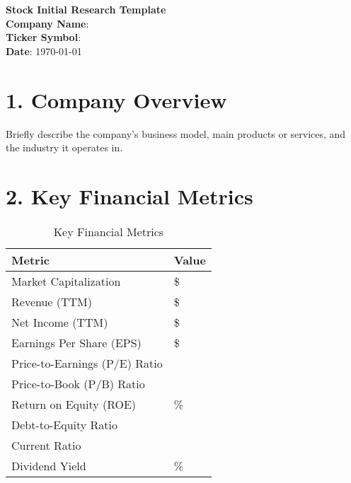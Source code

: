 \documentclass[12pt]{article}
\begin{document}
\begin{center}
    {\Large \textbf{Stock Initial Research Template}}\\[1.5em]
    \textbf{Company Name}: \underline{\hspace{8cm}}\\[0.5em]
    \textbf{Ticker Symbol}: \underline{\hspace{7cm}}\\[0.5em]
    \textbf{Date}: \today
\end{center}

\vspace{1em}

\section*{1. Company Overview}
Briefly describe the company's business model, main products or services, and the industry it operates in.

\section*{2. Key Financial Metrics}
\begin{table}[H]
    \centering
    \begin{tabular}{@{}ll@{}}
        \toprule
        \textbf{Metric}                 & \textbf{Value}                    \\
        \midrule
        Market Capitalization           & \$\underline{\hspace{5cm}}        \\
        Revenue (TTM)                   & \$\underline{\hspace{5cm}}        \\
        Net Income (TTM)                & \$\underline{\hspace{5cm}}        \\
        Earnings Per Share (EPS)        & \$\underline{\hspace{5cm}}        \\
        Price-to-Earnings (P/E) Ratio   & \underline{\hspace{5cm}}          \\
        Price-to-Book (P/B) Ratio       & \underline{\hspace{5cm}}          \\
        Return on Equity (ROE)          & \underline{\hspace{5cm}} \%       \\
        Debt-to-Equity Ratio            & \underline{\hspace{5cm}}          \\
        Current Ratio                   & \underline{\hspace{5cm}}          \\
        Dividend Yield                  & \underline{\hspace{5cm}} \%       \\
        \bottomrule
    \end{tabular}
    \caption{Key Financial Metrics}
\end{table}
\end{document}
